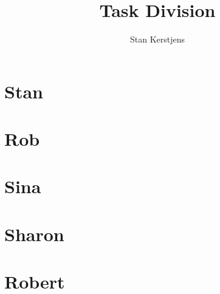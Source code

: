 \documentclass{article}
\title{Task Division}
\author{Stan Kerstjens}
\begin{document}
	\maketitle
	\section{Stan}
		
		\newpage
	\section{Rob}
		
		\newpage
	\section{Sina}
		
		\newpage
	\section{Sharon}
		
		\newpage
	\section{Robert}
		
\end{document}
